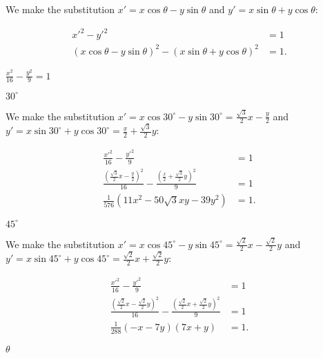 \documentclass[../key.tex]{subfiles}
\begin{document}
\noindent We make the substitution $x'=x \cos \theta - y\sin \theta$ and $y'=x\sin \theta + y\cos \theta$:

\begin{align*}
x'^2-y'^2&=1 \\
(x \cos \theta - y\sin \theta)^2 - (x\sin \theta + y\cos \theta)^2 &= 1.
\end{align*}

\begin{inner_problem}
\item $\frac{x^2}{16}-\frac{y^2}{9}=1$
\end{inner_problem}

\begin{iinner_problem}[start=1]
\item $30^\circ$
\end{iinner_problem}

\noindent We make the substitution $x'=x \cos 30^\circ - y\sin 30^\circ=\frac{\sqrt{3}}{2}x-\frac{y}{2}$ and $y'=x\sin 30^\circ + y\cos 30^\circ=\frac{x}{2}+\frac{\sqrt{3}}{2}y$:

\begin{align*}
\frac{x'^2}{16}-\frac{y'^2}{9} &= 1 \\
\frac{\left(\frac{\sqrt{3}}{2}x-\frac{y}{2}\right)^2}{16} - \frac{\left(\frac{x}{2}+\frac{\sqrt{3}}{2}y\right)^2}{9} &= 1 \\
\frac{1}{576} (11 x^2 - 50 \sqrt{3} x y - 39 y^2) &= 1.
\end{align*}

\begin{iinner_problem}
\item $45^\circ$
\end{iinner_problem}

\noindent We make the substitution $x'=x \cos 45^\circ - y\sin 45^\circ=\frac{\sqrt{2}}{2}x-\frac{\sqrt{2}}{2}y$ and $y'=x\sin 45^\circ + y\cos 45^\circ=\frac{\sqrt{2}}{2}x+\frac{\sqrt{2}}{2}y$:

\begin{align*}
\frac{x'^2}{16}-\frac{y'^2}{9} &= 1 \\
\frac{\left(\frac{\sqrt{2}}{2}x-\frac{\sqrt{2}}{2}y\right)^2}{16} - \frac{\left(\frac{\sqrt{2}}{2}x+\frac{\sqrt{2}}{2}y\right)^2}{9} &= 1 \\
\frac{1}{288} (-x - 7 y) (7 x + y) &= 1.
\end{align*}

\begin{iinner_problem}
\item $\theta$
\end{iinner_problem}
\end{document}
